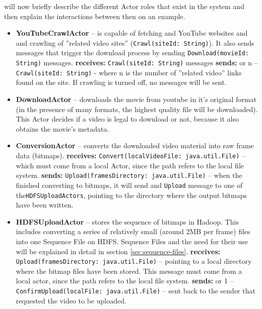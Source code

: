 will now briefly describe the different Actor roles that exist in the system and then explain the interactions between then on an example.

\begin{itemize}
  \item \textbf{YouTubeCrawlActor} -- is capable of fetching and YouTube websites and and crawling of ''related video 
                                      sites'' (\verb|Crawl(siteId: String)|). It also sends messages that trigger the 
                                      download process by sending \verb|Download(movieId: String)| messages.
    \subitem  \textbf{receives:}
      \subsubitem \verb|Crawl(siteId: String)| messages
    \subitem  \textbf{sends:}
       or n -- \verb|Crawl(siteId: String)| - where n is the number of ''related video'' links found on the site. 
                                                           If crawling is turned off, no messages will be sent.

  \item \textbf{DownloadActor} -- downloads the movie from youtube in it's original format (in the presence of many formats, 
                                the highest quality file will be downloaded). This Actor decides if a video is legal to download or not, because it also obtains the movie's metadata.
                                
  \item \textbf{ConversionActor} -- converts the downloaded video material into raw frame data (bitmaps).
    \subitem  \textbf{receives:}
      \subsubitem \verb|Convert(localVideoFile: java.util.File)| -- which must come from a local Actor, since the path refers to the local file system.
    \subitem  \textbf{sends:}
      \subsubitem \verb|Upload(framesDirectory: java.util.File)| -- when the finished converting to bitmaps, it will send and \verb|Upload| message to one of the\verb|HDFSUploadActors|, pointing to the directory where the output bitmaps have been written.
                                                                    
  \item \textbf{HDFSUploadActor} -- stores the sequence of bitmaps in Hadoop. This includes converting a series of 
                                  relatively small (around 2MB per frame) files into one Sequence File on HDFS. Sequence Files and the need for their use
                                  will be explained in detail in section \ref{sec:sequence-files}.
  \subitem \textbf{receives:}
    \subsubitem \verb|Upload(framesDirectory: java.util.File)| -- pointing to a local directory where the bitmap files have been stored.
                                                                 This message must come from a local actor, since the path refers to the local file system.
    \subitem  \textbf{sends:}
       or 1 -- \verb|ConfirmUpload(localFile: java.util.File)| -- sent back to the sender that requested the video to be uploaded.
\end{itemize}

